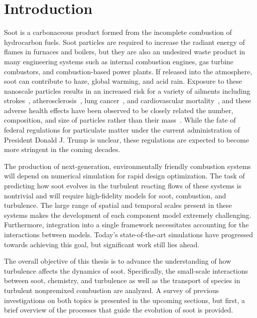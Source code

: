 \chapter{Introduction\label{ch:intro}}
 
Soot is a carbonaceous product formed from the incomplete combustion of hydrocarbon fuels. Soot particles are required to increase the radiant energy of flames in furnaces and boilers, but they are also an undesired waste product in many engineering systems such as internal combustion engines, gas turbine combustors, and combustion-based power plants. If released into the atmosphere, soot can contribute to haze, global warming, and acid rain. Exposure to these nanoscale particles results in an increased risk for a variety of ailments including strokes~\cite{popeiii2006}, atherosclerosis~\cite{polichetti2009,kennedy2007,popeiii2006}, lung cancer~\cite{kennedy2007,popeiii2006}, and cardiovascular mortality~\cite{polichetti2009,kennedy2007,popeiii2006}, and these adverse health effects have been observed to be closely related the number, composition, and size of particles rather than their mass~\cite{seaton1995,lighty2000}. While the fate of federal regulations for particulate matter under the current administration of President Donald J. Trump is unclear, these regulations are expected to become more stringent in the coming decades. 

The production of next-generation, environmentally friendly combustion systems will depend on numerical simulation for rapid design optimization. The task of predicting how soot evolves in the turbulent reacting flows of these systems is nontrivial and will require high-fidelity models for soot, combustion, and turbulence. The large range of spatial and temporal scales present in these systems makes the development of each component model extremely challenging. Furthermore, integration into a single framework necessitates accounting for the interactions between models. Today's state-of-the-art simulations have progressed towards achieving this goal, but significant work still lies ahead. 

The overall objective of this thesis is to advance the understanding of how turbulence affects the dynamics of soot. Specifically, the small-scale interactions between soot, chemistry, and turbulence as well as the transport of species in turbulent nonpremixed combustion are analyzed. A survey of previous investigations on both topics is presented in the upcoming sections, but first, a brief overview of the processes that guide the evolution of soot is provided.


